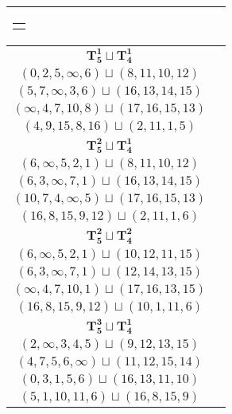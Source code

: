 \documentclass{article}
\begin{document}
\begin{longtable}{|c|c|}
\begin{tabular}{c}
        $(4,0,8,5,6,7)\sqcup(1,11,2)$
        \end{tabular} \\ 
        \hline
        $\mathbf{T_{5}^{1}} \sqcup \mathbf{T_{4}^{1}}$ & \begin{tabular}{c}
        $(5,4,2,\infty,1)\sqcup(11,13,12,15)$ \\ 
        $(0,2,5,\infty,6)\sqcup(8,11,10,12)$ \\ 
        $(5,7,\infty,3,6)\sqcup(16,13,14,15)$ \\ 
        $(\infty,4,7,10,8)\sqcup(17,16,15,13)$ \\ 
        $(4,9,15,8,16)\sqcup(2,11,1,5)$
        \end{tabular} \\ 
        \hline
        $\mathbf{T_{5}^{2}} \sqcup \mathbf{T_{4}^{1}}$ & \begin{tabular}{c}
        $(\infty,2,4,5,0)\sqcup(11,13,12,15)$ \\ 
        $(6,\infty,5,2,1)\sqcup(8,11,10,12)$ \\ 
        $(6,3,\infty,7,1)\sqcup(16,13,14,15)$ \\ 
        $(10,7,4,\infty,5)\sqcup(17,16,15,13)$ \\ 
        $(16,8,15,9,12)\sqcup(2,11,1,6)$
        \end{tabular} \\ 
        \hline
        $\mathbf{T_{5}^{2}} \sqcup \mathbf{T_{4}^{2}}$ & \begin{tabular}{c}
        $(\infty,2,4,3,0)\sqcup(11,13,12,15)$ \\ 
        $(6,\infty,5,2,1)\sqcup(10,12,11,15)$ \\ 
        $(6,3,\infty,7,1)\sqcup(12,14,13,15)$ \\ 
        $(\infty,4,7,10,1)\sqcup(17,16,13,15)$ \\ 
        $(16,8,15,9,12)\sqcup(10,1,11,6)$
        \end{tabular} \\ 
        \hline
        $\mathbf{T_{5}^{3}} \sqcup \mathbf{T_{4}^{1}}$ & \begin{tabular}{c}
        $(0,2,1,3,4)\sqcup(11,8,\infty,6)$ \\ 
        $(2,\infty,3,4,5)\sqcup(9,12,13,15)$ \\ 
        $(4,7,5,6,\infty)\sqcup(11,12,15,14)$ \\ 
        $(0,3,1,5,6)\sqcup(16,13,11,10)$ \\ 
        $(5,1,10,11,6)\sqcup(16,8,15,9)$
        \end{tabular} \\ 

\end{longtable}
\end{document}

